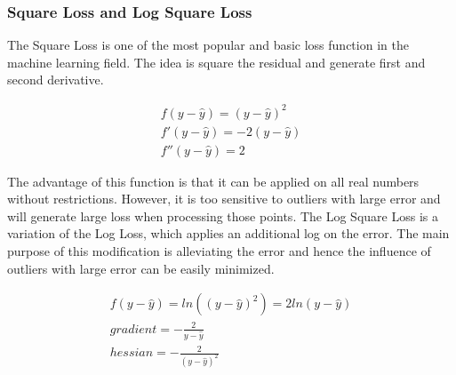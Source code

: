\documentclass[runningheads]{llncs}
\begin{document}
\subsubsection{Square Loss and Log Square Loss}
The Square Loss is one of the most popular and basic loss function in the machine learning field. The idea is square the residual and generate first and second derivative.

\begin{align}
  f(y-\hat{y}) = (y-\hat{y})^2 \\
  f'(y - \hat{y})= -2(y-\hat{y}) \\
  f''(y - \hat{y})= 2
\end{align}

The advantage of this function is that it can be applied on all real numbers without restrictions. However, it is too sensitive to outliers with large error and will generate large loss when processing those points. The Log Square Loss is a variation of the Log Loss, which applies an additional log on the error. The main purpose of this modification is alleviating the error and hence the influence of outliers with large error can be easily minimized. 

\begin{align}
	f(y - \hat{y}) = ln((y-\hat{y})^2) = 2ln(y-\hat{y}) \\
	gradient  = -\frac{2}{y - \hat{y}} \\
	hessian  = -\frac{2}{(y - \hat{y})^2}
\end{align}
\end{document}
